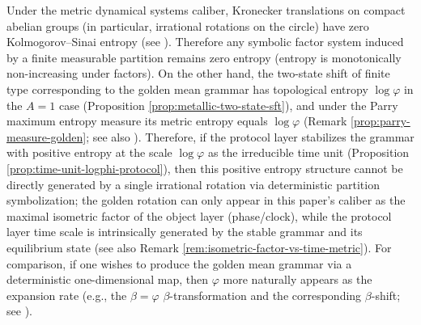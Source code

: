 \begin{remark}\label{rem:terminal-rotation-entropy-obstruction}
Under the metric dynamical systems caliber, Kronecker translations on compact abelian groups (in particular, irrational rotations on the circle) have zero Kolmogorov--Sinai entropy (see \cite{WaltersErgodicTheory}).
Therefore any symbolic factor system induced by a finite measurable partition remains zero entropy (entropy is monotonically non-increasing under factors).
On the other hand, the two-state shift of finite type corresponding to the golden mean grammar has topological entropy \(\log\varphi\) in the \(A=1\) case (Proposition \ref{prop:metallic-two-state-sft}), and under the Parry maximum entropy measure its metric entropy equals \(\log\varphi\) (Remark \ref{prop:parry-measure-golden}; see also \cite{LindMarcus1995}).
Therefore, if the protocol layer stabilizes the grammar with positive entropy at the scale \(\log\varphi\) as the irreducible time unit (Proposition \ref{prop:time-unit-logphi-protocol}), then this positive entropy structure cannot be directly generated by a single irrational rotation via deterministic partition symbolization; the golden rotation can only appear in this paper's caliber as the maximal isometric factor of the object layer (phase/clock), while the protocol layer time scale is intrinsically generated by the stable grammar and its equilibrium state (see also Remark \ref{rem:isometric-factor-vs-time-metric}).
For comparison, if one wishes to produce the golden mean grammar via a deterministic one-dimensional map, then \(\varphi\) more naturally appears as the expansion rate (e.g., the \(\beta=\varphi\) \(\beta\)-transformation and the corresponding \(\beta\)-shift; see \cite{LindMarcus1995}).
\end{remark}

